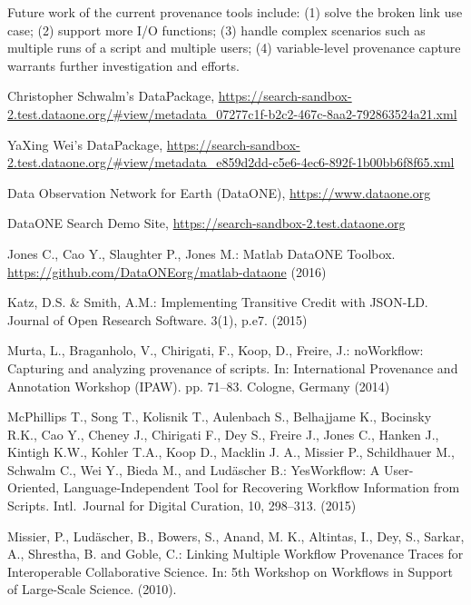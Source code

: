 \documentclass[a4paper]{llncs}
\begin{document}
Future work of the current provenance tools include: (1) solve the broken link use case; (2) support more I/O functions; (3) handle complex scenarios such as multiple runs of a script and multiple users; (4) variable-level provenance capture warrants further investigation and efforts.



\begin{thebibliography}{4}
\small

 Christopher Schwalm's DataPackage, \url{https://search-sandbox-2.test.dataone.org/#view/metadata_07277c1f-b2c2-467c-8aa2-792863524a21.xml}

 YaXing Wei's DataPackage, \url{https://search-sandbox-2.test.dataone.org/#view/metadata_e859d2dd-c5e6-4ec6-892f-1b00bb6f8f65.xml}

 Data Observation Network for Earth (DataONE), \url{https://www.dataone.org}

 DataONE Search Demo Site, \url{https://search-sandbox-2.test.dataone.org}

 Jones C., Cao Y., Slaughter P., Jones M.: Matlab DataONE Toolbox. \url{https://github.com/DataONEorg/matlab-dataone} (2016)

 Katz, D.S. \& Smith, A.M.: Implementing Transitive Credit with JSON-LD. Journal of Open Research Software. 3(1), p.e7. (2015) 

 Murta, L., Braganholo, V., Chirigati, F., Koop, D., Freire, J.: noWorkflow:
  Capturing and analyzing provenance of scripts. In: International Provenance
  and Annotation Workshop (IPAW). pp. 71--83. Cologne, Germany (2014)

 McPhillips T., Song T., Kolisnik T., Aulenbach S., Belhajjame K., Bocinsky R.K., Cao Y., Cheney J., Chirigati F., Dey S., Freire J., Jones C., Hanken J., Kintigh K.W., Kohler T.A., Koop D., Macklin J. A., Missier P., Schildhauer M., Schwalm C., Wei Y., Bieda M., and Lud\"ascher B.: YesWorkflow: A User-Oriented, Language-Independent Tool for Recovering Workflow Information from Scripts. Intl.\  Journal for Digital Curation, 10, 298--313. (2015)

 Missier, P., Lud\"ascher, B., Bowers, S., Anand, M. K., Altintas, I., Dey, S., Sarkar, A., Shrestha, B. and Goble, C.: Linking Multiple Workflow Provenance Traces for Interoperable Collaborative Science.  In: 5th Workshop on Workflows in Support of Large-Scale Science. (2010). 


\end{thebibliography}
\end{document}
